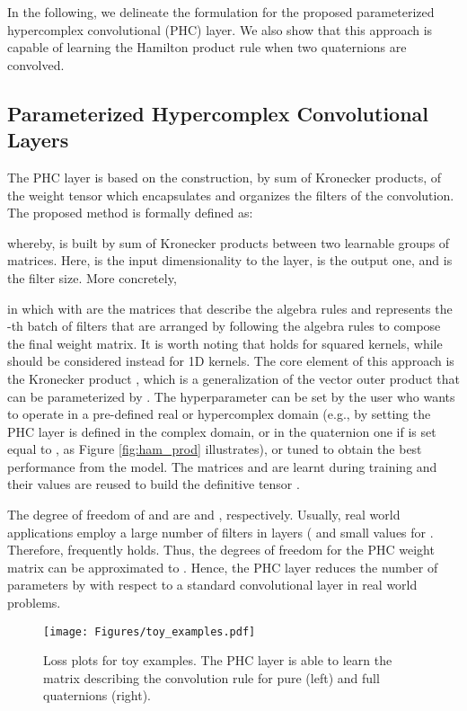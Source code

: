 \documentclass[lettersize,journal]{IEEEtran}
\begin{document}
In the following, we delineate the formulation for the proposed parameterized hypercomplex convolutional (PHC) layer. We also show that this approach is capable of learning the Hamilton product rule when two quaternions are convolved.

\subsection{Parameterized Hypercomplex Convolutional Layers}
\label{subsec:phc_layers}

The PHC layer is based on the construction, by sum of Kronecker products, of the weight tensor  which encapsulates and organizes the filters of the convolution. The proposed method is formally defined as:


\noindent whereby,   is built by sum of Kronecker products between two learnable groups of matrices. Here,  is the input dimensionality to the layer,  is the output one, and  is the filter size.
More concretely,



\noindent in which  with  are the matrices that describe the algebra rules and  represents the -th batch of filters that are arranged by following the algebra rules to compose the final weight matrix. It is worth noting that  holds for squared kernels, while  should be considered instead for 1D kernels. The core element of this approach is the Kronecker product \cite{KroneckerBook}, which is a generalization of the vector outer product that can be parameterized by . The hyperparameter  can be set by the user who wants to operate in a pre-defined real or hypercomplex domain (e.g., by setting  the PHC layer is defined in the complex domain, or in the quaternion one if  is set equal to , as Figure \ref{fig:ham_prod} illustrates), or tuned to obtain the best performance from the model. The matrices  and  are learnt during training and their values are reused to build the definitive tensor . 

The degree of freedom of  and  are  and , respectively. Usually, real world applications employ a large number of filters in layers ( and small values for . Therefore, frequently  holds. Thus, the degrees of freedom for the PHC weight matrix can be approximated to . Hence, the PHC layer reduces the number of parameters by  with respect to a standard convolutional layer in real world problems.

\begin{figure}[t]
    \begin{center}
        \texttt{[image: Figures/toy\_examples.pdf]}
    \end{center}
    \caption{Loss plots for toy examples. The PHC layer is able to learn the matrix  describing the convolution rule for pure (left) and full quaternions (right).}
    \label{fig:toy}
\end{figure}
\end{document}
